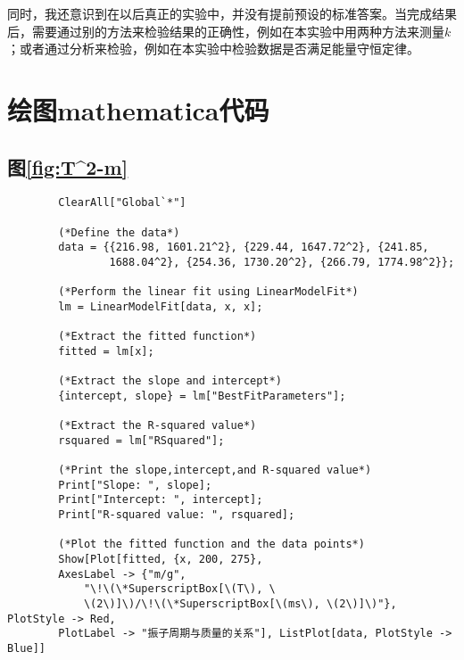 \documentclass[11pt]{article}
\begin{document}
	同时，我还意识到在以后真正的实验中，并没有提前预设的标准答案。当完成结果后，需要通过别的方法来检验结果的正确性，例如在本实验中用两种方法来测量$k$；或者通过分析来检验，例如在本实验中检验数据是否满足能量守恒定律。
	
	\newpage
	
	\appendix
	
	
	
	\section{绘图mathematica代码}
	
	\subsection{图\ref{fig:T^2-m}}
	\begin{lstlisting}
		ClearAll["Global`*"]
		
		(*Define the data*)
		data = {{216.98, 1601.21^2}, {229.44, 1647.72^2}, {241.85, 
				1688.04^2}, {254.36, 1730.20^2}, {266.79, 1774.98^2}};
		
		(*Perform the linear fit using LinearModelFit*)
		lm = LinearModelFit[data, x, x];
		
		(*Extract the fitted function*)
		fitted = lm[x];
		
		(*Extract the slope and intercept*)
		{intercept, slope} = lm["BestFitParameters"];
		
		(*Extract the R-squared value*)
		rsquared = lm["RSquared"];
		
		(*Print the slope,intercept,and R-squared value*)
		Print["Slope: ", slope];
		Print["Intercept: ", intercept];
		Print["R-squared value: ", rsquared];
		
		(*Plot the fitted function and the data points*)
		Show[Plot[fitted, {x, 200, 275}, 
		AxesLabel -> {"m/g", 
			"\!\(\*SuperscriptBox[\(T\), \
			\(2\)]\)/\!\(\*SuperscriptBox[\(ms\), \(2\)]\)"}, PlotStyle -> Red, 
		PlotLabel -> "振子周期与质量的关系"], ListPlot[data, PlotStyle -> Blue]]
	\end{lstlisting}
\end{document}
